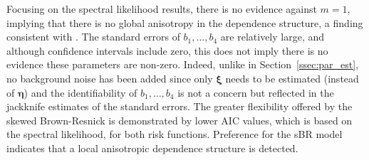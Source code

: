 \documentclass[12pt]{article}
\begin{document}
Focusing on the spectral likelihood results,
there is no evidence against $m=1$, implying that there is no global anisotropy in the dependence structure, a finding consistent with \cite{deFondeville.Davison:2018}. 
%
The standard errors of 
$b_1,\ldots,b_4$ are relatively large, and although confidence intervals include zero, this does not imply there is no evidence these parameters are non-zero. 
Indeed, unlike in Section~\ref{ssec:par_est}, no background noise has been added since only $\bm \xi$ needs to be estimated (instead of $\bm \eta$) and the identifiability of $b_1, \ldots, b_4$ is not a concern but reflected in the jackknife estimates of the standard errors.
%
The greater flexibility offered by the skewed Brown-Resnick is demonstrated by lower AIC values, which is based on the spectral likelihood, 
for both risk functions.
Preference for the sBR model indicates that a local anisotropic dependence structure is detected.

 
\end{document}
